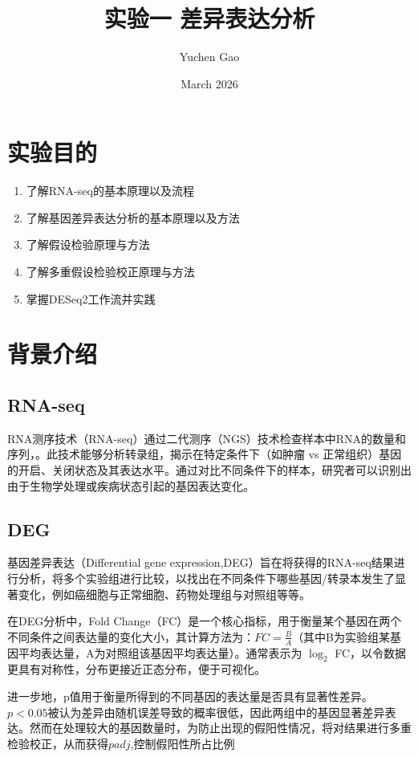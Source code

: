 \documentclass{article}
\title{实验一  差异表达分析}
\author{Yuchen Gao}
\date{March 2026}
\begin{document}
\maketitle

\section{实验目的}

\begin{enumerate}
    \item 了解RNA-seq的基本原理以及流程
    \item 了解基因差异表达分析的基本原理以及方法
    \item 了解假设检验原理与方法
    \item 了解多重假设检验校正原理与方法
    \item 掌握DESeq2工作流并实践
\end{enumerate}

\section{背景介绍}

\subsection{RNA-seq}

RNA测序技术（RNA-seq）通过二代测序（NGS）技术检查样本中RNA的数量和序列，。此技术能够分析转录组，揭示在特定条件下（如肿瘤 vs 正常组织）基因的开启、关闭状态及其表达水平。通过对比不同条件下的样本，研究者可以识别出由于生物学处理或疾病状态引起的基因表达变化。

\subsection{DEG}

基因差异表达（Differential gene expression,DEG）旨在将获得的RNA-seq结果进行分析，将多个实验组进行比较，以找出在不同条件下哪些基因/转录本发生了显著变化，例如癌细胞与正常细胞、药物处理组与对照组等等。

在DEG分析中，Fold Change（FC）是一个核心指标，用于衡量某个基因在两个不同条件之间表达量的变化大小，其计算方法为：$FC = \frac{B}{A}$（其中B为实验组某基因平均表达量，A为对照组该基因平均表达量）。通常表示为 $\log_2$ FC，以令数据更具有对称性，分布更接近正态分布，便于可视化。

进一步地，p值用于衡量所得到的不同基因的表达量是否具有显著性差异。$p < 0.05$被认为差异由随机误差导致的概率很低，因此两组中的基因显著差异表达。然而在处理较大的基因数量时，为防止出现的假阳性情况，将对结果进行多重检验校正，从而获得$padj$,控制假阳性所占比例
\end{document}
